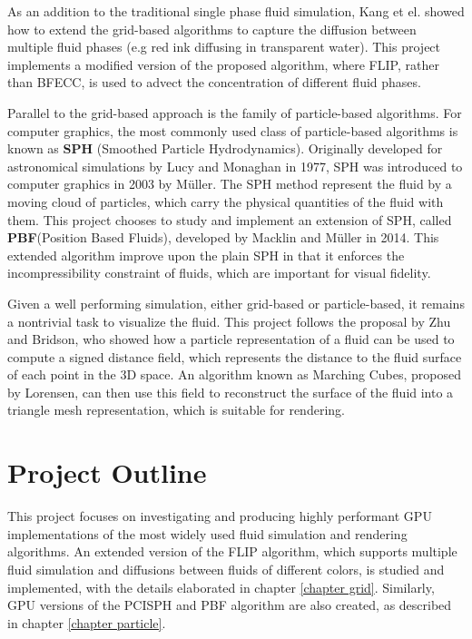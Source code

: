 As an addition to the traditional single phase fluid simulation, Kang et el.\cite{kang2010hybrid} showed how to extend the grid-based algorithms to capture the diffusion between multiple fluid phases (e.g red ink diffusing in transparent water). This project implements a modified version of the proposed algorithm, where FLIP, rather than BFECC, is used to advect the concentration of different fluid phases.




Parallel to the grid-based approach is the family of particle-based algorithms. For computer graphics, the most commonly used class of particle-based algorithms is known as \textbf{SPH} (Smoothed Particle Hydrodynamics). Originally developed for astronomical simulations by Lucy\cite{lucy1977numerical} and Monaghan \cite{monaghan1992smoothed} in 1977, SPH was introduced to computer graphics in 2003 by Müller\cite{muller2003particle}. The SPH method represent the fluid by a moving cloud of particles, which carry the physical quantities of the fluid with them. This project chooses to study and implement an extension of SPH, called \textbf{PBF}(Position Based Fluids), developed by Macklin and Müller\cite{macklin2013position} in 2014. This extended algorithm improve upon the plain SPH in that it enforces the incompressibility constraint of fluids, which are important for visual fidelity. 




Given a well performing simulation, either grid-based or particle-based, it remains a nontrivial task to visualize the fluid. This project follows the proposal by Zhu and Bridson\cite{zhu2005animating}, who showed how a particle representation of a fluid can be used to compute a signed distance field, which represents the distance to the fluid surface of each point in the 3D space. An algorithm known as Marching Cubes, proposed by Lorensen\cite{lorensen1987marching}, can then use this field to reconstruct the surface of the fluid into a triangle mesh representation, which is suitable for rendering. 



\section{Project Outline}


This project focuses on investigating and producing highly performant GPU implementations of the most widely used fluid simulation and rendering algorithms. An extended version of the FLIP algorithm, which supports multiple fluid simulation and diffusions between fluids of different colors, is studied and implemented, with the details elaborated in chapter \ref{chapter grid}. Similarly, GPU versions of the PCISPH and PBF algorithm are also created, as described in chapter \ref{chapter particle}. 

